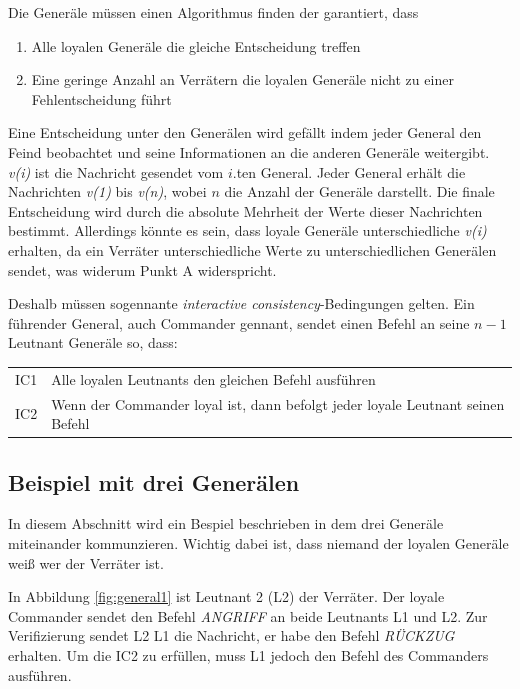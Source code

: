 \documentclass{article}
\begin{document}
\medskip 

Die Generäle müssen einen Algorithmus finden der garantiert, dass

\begin{enumerate}[label=(\alph*)]
\item Alle loyalen Generäle die gleiche Entscheidung treffen 
\item Eine geringe Anzahl an Verrätern die loyalen Generäle nicht zu einer Fehlentscheidung führt
\end{enumerate}

Eine Entscheidung unter den Generälen wird gefällt 
indem jeder General den Feind beobachtet und seine
Informationen an die anderen Generäle weitergibt. \textit{v(i)} ist die 
Nachricht gesendet vom $i$.ten General. Jeder General erhält die Nachrichten 
\textit{v(1)} bis \textit{v(n)}, wobei $n$ die Anzahl der Generäle darstellt. 
Die finale Entscheidung wird durch die absolute Mehrheit der Werte dieser Nachrichten
bestimmt. Allerdings könnte es sein, dass loyale Generäle unterschiedliche \textit{v(i)}
erhalten, da ein Verräter unterschiedliche Werte zu unterschiedlichen Generälen sendet, 
was widerum Punkt A widerspricht. 

\medskip 

Deshalb müssen sogennante \textit{interactive consistency}-Bedingungen gelten.
Ein führender General, auch Commander gennant, sendet einen Befehl an seine $n - 1$ Leutnant 
Generäle so, dass:

\smallskip 

\begin{tabular}{l l}
IC1 & Alle loyalen Leutnants den gleichen Befehl ausführen \\
IC2 & Wenn der Commander loyal ist, dann befolgt jeder loyale Leutnant seinen Befehl
\end{tabular}

\subsection{Beispiel mit drei Generälen}
In diesem Abschnitt wird ein Bespiel beschrieben in dem drei Generäle miteinander kommunzieren. 
Wichtig dabei ist, dass niemand der loyalen Generäle weiß wer der Verräter ist. 

\medskip

In Abbildung \ref{fig:general1} ist Leutnant 2 (L2) der Verräter. Der loyale Commander
sendet den Befehl \textit{ANGRIFF} an beide Leutnants L1 und L2. Zur Verifizierung sendet L2 L1 die Nachricht,
er habe den Befehl \textit{RÜCKZUG} erhalten. Um die IC2 zu erfüllen, muss L1 jedoch
den Befehl des Commanders ausführen. 
\end{document}
